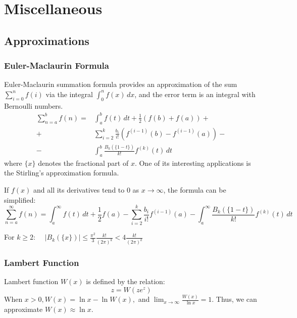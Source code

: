 \chapter{Miscellaneous}

\section{Approximations}

\subsection{Euler-Maclaurin Formula}

Euler-Maclaurin summation formula provides an approximation of the sum $\sum_{i=0}^n{f(i)}$
via the integral $\int_0^n{f(x)\,dx}$, and the error term is an integral with Bernoulli numbers.
\begin{equation}
    \label{eq:euler-maclaurin-formula}
    \begin{split}
        \sum_{n=a}^b{f(n)}=&\int_a^b{f(t)\,dt}+\frac{1}{2}(f(b)+f(a))+\\
        +&\sum_{i=2}^k{\frac{b_i}{i!}\left(f^{(i-1)}(b)-f^{(i-1)}(a)\right)}-\\
        -&\int_a^b{\frac{B_k(\{1-t\})}{k!}f^{(k)}(t)\,dt}
    \end{split}
\end{equation}
where $\{x\}$ denotes the fractional part of $x$.
One of its interesting applications is the Stirling's approximation formula.

If $f(x)$ and all its derivatives tend to $0$ as $x\to\infty$, the formula can be simplified:
\begin{equation}
    \sum_{n=a}^\infty{f(n)}=\int_a^\infty{f(t)\,dt}+\frac{1}{2}f(a)
    -\sum_{i=2}^k{\frac{b_i}{i!}f^{(i-1)}(a)}
    -\int_a^\infty{\frac{B_k(\{1-t\})}{k!}f^{(k)}(t)\,dt}
\end{equation}

For $k\geq2$: $\quad|B_k(\{x\})|\leq\frac{\pi^2}{3}\frac{k!}{(2\pi)^k}<4\frac{k!}{(2\pi)^k}$

\subsection{Lambert Function}

Lambert function $W(x)$ is defined by the relation:
\begin{equation}
    z=W(ze^z)
\end{equation}
When $x>0, W(x)=\ln x-\ln W(x),$ and $\lim_{x\to\infty}{\frac{W(x)}{\ln x}}=1$.
Thus, we can approximate $W(x)\approx\ln x$.


